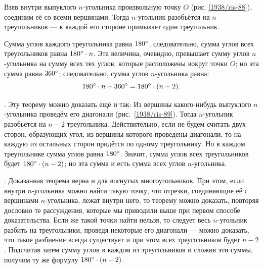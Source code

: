 Взяв внутри выпуклого $n$-угольника произвольную точку $O$ (рис. \ref{1938/ris-88}), соединим её со всеми вершинами.
Тогда $n$-угольник разобьётся на $n$ треугольников — к каждой его стороне примыкает один треугольник.

Сумма углов каждого треугольника равна $180\degree$, следовательно, сумма углов всех треугольников равна $180\degree\cdot n$.
Эта величина, очевидно, превышает сумму углов $n$-угольника на сумму всех тех углов, которые расположены вокруг точки $O$;
но эта сумма равна $360\degree$;
следовательно, сумма углов $n$-угольника равна:
\[180\degree\cdot n -360\degree = 180\degree\cdot(n - 2).\]

{\small 

\smallskip
\mbox{.}
Эту теорему можно доказать ещё и так:
Из вершины какого-нибудь выпуклого $n$-угольника проведём его диагонали (рис.~\ref{1938/ris-89}).
Тогда $n$-угольник разобьётся на $n-2$ треугольника.
Действительно, если не будем считать двух сторон, образующих угол, из вершины которого проведены диагонали, то на каждую из остальных сторон придётся по одному треугольнику.
Но в каждом треугольнике сумма углов равна $180\degree$.
Значит, сумма углов всех треугольников будет $180\degree\cdot(n-2)$;
но эта сумма и есть сумма всех углов $n$-угольника.

{\small

\medskip
\smallskip
{}.
Доказанная теорема верна и для вогнутых многоугольников.
При этом, если внутри $n$-угольника можно найти такую точку, что отрезки, соединяющие её с вершинами $n$-угольника, лежат внутри него, то теорему можно доказать, повторяя дословно те рассуждения, которые мы приводили выше при первом способе доказательства.
Если же такой точки найти нельзя, то следует весь $n$-угольник разбить на треугольники, проведя некоторые его диагонали — можно доказать, что такое разбиение всегда существует и при этом всех треугольников будет $n-2$.
Подсчитав затем сумму углов в каждом из треугольников и сложив эти суммы, получим ту же формулу $180\degree\cdot(n - 2)$.

}

}

